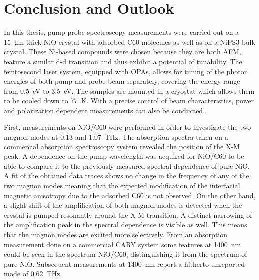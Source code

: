\chapter{Conclusion and Outlook}

In this thesis, pump-probe spectroscopy measurements were carried out on a \qty{15}{\um}-thick NiO crystal with adsorbed C60 molecules as well as on a NiPS3 bulk crystal.
These Ni-based compounds were chosen because they are both AFM, feature a similar d-d transition and thus exhibit a potential of tunability.
The femtosecond laser system, equipped with OPAs, allows for tuning of the photon energies of both pump and probe beam separately, covering the energy range from \qty{0.5}{eV} to \qty{3.5}{eV}.
The samples are mounted in a cryostat which allows them to be cooled down to \qty{77}{K}.
With a precise control of beam characteristics, power and polarization dependent measurements can also be conducted.

First, measurements on NiO/C60 were performed in order to investigate the two magnon modes at 0.13 and \qty{1.07}{THz}.
The absorption spectra taken on a commercial absorption spectroscopy system revealed the position of the X-M peak.
A dependence on the pump wavelength was acquired for NiO/C60 to be able to compare it to the previously measured spectral dependence of pure NiO.
A fit of the obtained data traces shows no change in the frequency of any of the two magnon modes meaning that the expected modification of the interfacial magnetic anisotropy due to the adsorbed C60 is not observed.
On the other hand, a slight shift of the amplification of both magnon modes is detected when the crystal is pumped resonantly around the X-M transition.
A distinct narrowing of the amplification peak in the spectral dependence is visible as well.
This means that the magnon modes are excited more selectively.
From an absorption measurement done on a commercial CARY system some features at \qty{1400}{nm} could be seen in the spectrum NiO/C60, distinguishing it from the spectrum of pure NiO.
Subsequent measurements at \qty{1400}{nm} report a hitherto unreported mode of \qty{0.62}{THz}.

